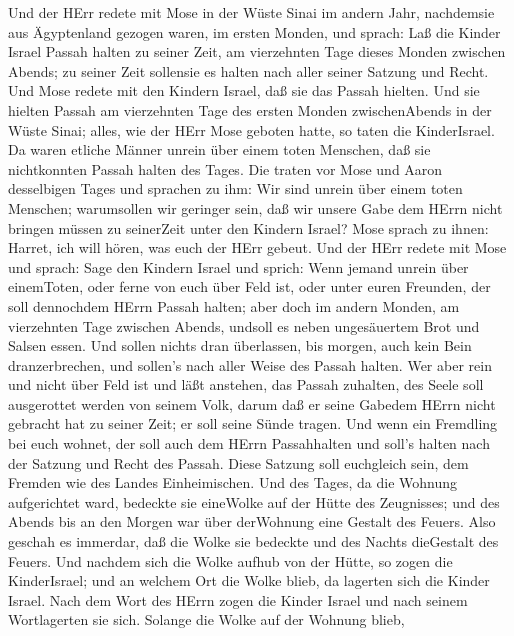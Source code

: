  Und der HErr redete mit Mose in der Wüste Sinai im andern
Jahr, nachdemsie aus Ägyptenland gezogen waren, im ersten Monden, und
sprach:  Laß die Kinder Israel Passah halten zu seiner Zeit,
 am vierzehnten Tage dieses Monden zwischen Abends; zu
seiner Zeit sollensie es halten nach aller seiner Satzung und Recht.
 Und Mose redete mit den Kindern Israel, daß sie das Passah
hielten.  Und sie hielten Passah am vierzehnten Tage des
ersten Monden zwischenAbends in der Wüste Sinai; alles, wie der HErr
Mose geboten hatte, so taten die KinderIsrael.  Da waren
etliche Männer unrein über einem toten Menschen, daß sie nichtkonnten
Passah halten des Tages. Die traten vor Mose und Aaron desselbigen Tages
 und sprachen zu ihm: Wir sind unrein über einem toten
Menschen; warumsollen wir geringer sein, daß wir unsere Gabe dem HErrn
nicht bringen müssen zu seinerZeit unter den Kindern Israel?
 Mose sprach zu ihnen: Harret, ich will hören, was euch der
HErr gebeut.  Und der HErr redete mit Mose und sprach:
 Sage den Kindern Israel und sprich: Wenn jemand unrein
über einemToten, oder ferne von euch über Feld ist, oder unter euren
Freunden, der soll dennochdem HErrn Passah halten;  aber
doch im andern Monden, am vierzehnten Tage zwischen Abends, undsoll es
neben ungesäuertem Brot und Salsen essen.  Und sollen
nichts dran überlassen, bis morgen, auch kein Bein dranzerbrechen, und
sollen's nach aller Weise des Passah halten.  Wer aber rein
und nicht über Feld ist und läßt anstehen, das Passah zuhalten, des
Seele soll ausgerottet werden von seinem Volk, darum daß er seine
Gabedem HErrn nicht gebracht hat zu seiner Zeit; er soll seine Sünde
tragen.  Und wenn ein Fremdling bei euch wohnet, der soll
auch dem HErrn Passahhalten und soll's halten nach der Satzung und Recht
des Passah. Diese Satzung soll euchgleich sein, dem Fremden wie des
Landes Einheimischen.  Und des Tages, da die Wohnung
aufgerichtet ward, bedeckte sie eineWolke auf der Hütte des Zeugnisses;
und des Abends bis an den Morgen war über derWohnung eine Gestalt des
Feuers.  Also geschah es immerdar, daß die Wolke sie
bedeckte und des Nachts dieGestalt des Feuers.  Und nachdem
sich die Wolke aufhub von der Hütte, so zogen die KinderIsrael; und an
welchem Ort die Wolke blieb, da lagerten sich die Kinder Israel.
 Nach dem Wort des HErrn zogen die Kinder Israel und nach
seinem Wortlagerten sie sich. Solange die Wolke auf der Wohnung blieb,
